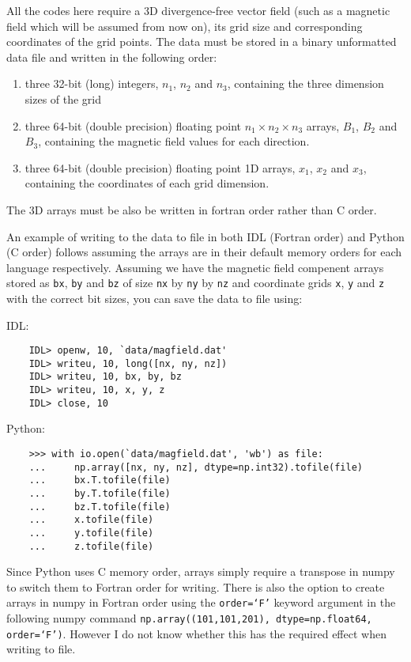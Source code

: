 \documentclass[12pt]{article}
\begin{document}
    All the codes here require a 3D divergence-free vector field (such as a magnetic field which will be assumed from now on), its grid size and corresponding coordinates of the grid points. The data must be stored in a binary unformatted data file and written in the following order:
    \begin{enumerate}
      \item three 32-bit (long) integers, \( n_1 \), \( n_2 \) and \( n_3 \), containing the three dimension sizes of the grid
      \item three 64-bit (double precision) floating point \( n_1 \times n_2 \times n_3 \) arrays, \( B_1 \), \( B_2 \) and \( B_3 \), containing the magnetic field values for each direction.
      \item three 64-bit (double precision) floating point 1D arrays, \( x_1 \), \( x_2 \) and \( x_3 \), containing the coordinates of each grid dimension.
    \end{enumerate}
    The 3D arrays must be also be written in fortran order rather than C order.

    An example of writing to the data to file in both IDL (Fortran order) and Python (C order) follows assuming the arrays are in their default memory orders for each language respectively. Assuming we have the magnetic field compenent arrays stored as \texttt{bx}, \texttt{by} and \texttt{bz} of size \texttt{nx} by \texttt{ny} by \texttt{nz} and coordinate grids \texttt{x}, \texttt{y} and \texttt{z} with the correct bit sizes, you can save the data to file using:

    IDL:

    \begin{verbatim}
    IDL> openw, 10, `data/magfield.dat'
    IDL> writeu, 10, long([nx, ny, nz])
    IDL> writeu, 10, bx, by, bz
    IDL> writeu, 10, x, y, z
    IDL> close, 10
    \end{verbatim}

    Python:

    \begin{verbatim}
    >>> with io.open(`data/magfield.dat', 'wb') as file:
    ...     np.array([nx, ny, nz], dtype=np.int32).tofile(file)
    ...     bx.T.tofile(file)
    ...     by.T.tofile(file)
    ...     bz.T.tofile(file)
    ...     x.tofile(file)
    ...     y.tofile(file)
    ...     z.tofile(file)
    \end{verbatim}

    Since Python uses C memory order, arrays simply require a transpose in numpy to switch them to Fortran order for writing. There is also the option to create arrays in numpy in Fortran order using the \texttt{order=`F'} keyword argument in the following numpy command \texttt{np.array((101,101,201), dtype=np.float64, order=`F')}. However I do not know whether this has the required effect when writing to file.
\end{document}

